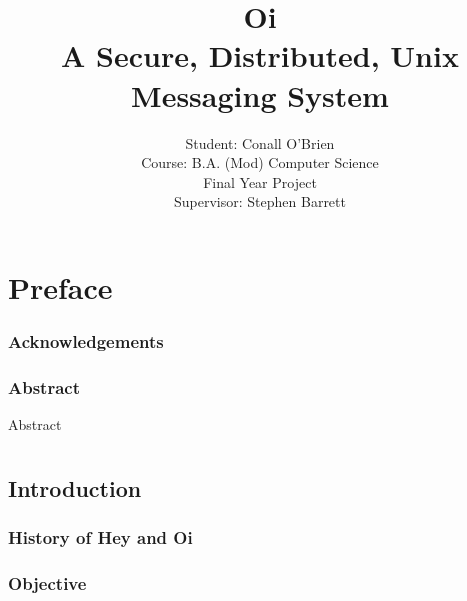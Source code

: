 \documentclass[a4paper,12pt]{report}
\begin{document}
\setlength{\rightskip}{0pt plus 2cm}

\title{Oi \\ A Secure, Distributed, Unix Messaging System}

\author{Student: Conall O'Brien \\ 
		  Course:  B.A. (Mod) Computer Science \\
		  Final Year Project \\ 
		  Supervisor: Stephen Barrett} 

\maketitle


\part{Preface}

\section{Acknowledgements}



\pagebreak

\section{Abstract}

Abstract

\tableofcontents

\part*{}

\chapter{Introduction}

\setcounter{page}{9}

\section{History of Hey and Oi}



\section{Objective}
\end{document}
